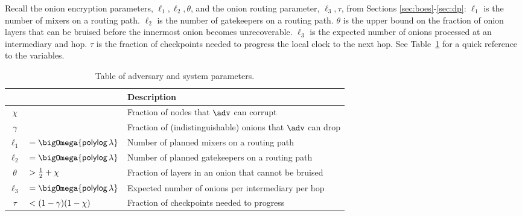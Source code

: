 \documentclass[runningheads,a4paper]{llncs}
\begin{document}
Recall the onion encryption parameters, $\ell_1, \ell_2, \theta$, and the onion routing parameter, $\ell_3, \tau$, from Sections \ref{sec:boes}-\ref{sec:dp}: 
$\ell_1$ is the number of mixers on a routing path.  $\ell_2$ is the number of gatekeepers on a routing path. 
$\theta$ is the upper bound on the fraction of onion layers that can be bruised before the innermost onion becomes unrecoverable. 
$\ell_3$ is the expected number of onions processed at an intermediary and hop. 
$\tau$ is the fraction of checkpoints needed to progress the local clock to the next hop. 
See Table~\ref{tab:vars} for a quick reference to the variables. %

\begin{table}[ht!]
    \centering
    \begin{tabular}{| c l | l |}
        \hline
        & & \textbf{Description} \\ \hline\hline
        $\chi$ & & Fraction of nodes that $\adv$ can corrupt \\
        $\gamma$ & & Fraction of (indistinguishable) onions that $\adv$ can drop \\
        $\ell_1$ &$=\bigOmega{\polylog\thinspace\secpar}$ & Number of planned mixers on a routing path\\
        $\ell_2$ &$=\bigOmega{\polylog\thinspace\secpar}$ & Number of planned gatekeepers on a routing path \\
        $\theta$ &$>\frac{1}{2} + \chi$ & Fraction of layers in an onion that cannot be bruised \\
        $\ell_3$ &$=\bigOmega{\polylog\thinspace\secpar}$ & Expected number of onions per intermediary per hop \\
        $\tau$ &$<(1 - \gamma)(1-\chi)$ & Fraction of checkpoints needed to progress \\
        \hline 
    \end{tabular} 
    \caption{\footnotesize{Table of adversary and system parameters.}}
    \label{tab:vars}
\end{table}
\end{document}
